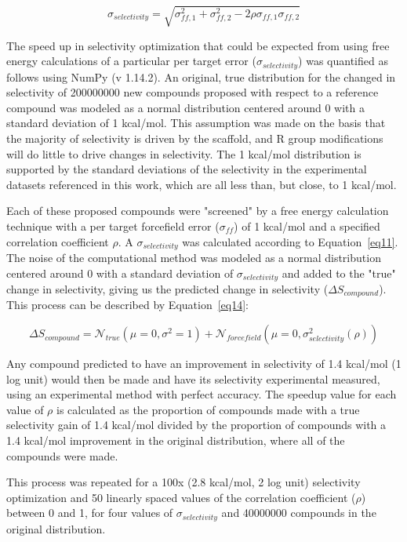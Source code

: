 \documentclass[9pt,lineno]{elife-modified} %
\begin{document}
\begin{equation}\label{eq11}
\sigma_{selectivity} = \sqrt{\sigma_{ff,1}^2 + \sigma_{ff,2}^2 - 2\rho\sigma_{ff,1}\sigma_{ff,2}}
\end{equation}

The speed up in selectivity optimization that could be expected from using free energy calculations of a particular per target error ($\sigma_{selectivity}$) was quantified as follows using NumPy (v 1.14.2). An original, true distribution for the changed in selectivity of 200000000 new compounds proposed with respect to a reference compound was modeled as a normal distribution centered around 0 with a standard deviation of 1 kcal/mol. This assumption was made on the basis that the majority of selectivity is driven by the scaffold, and R group modifications will do little to drive changes in selectivity. The 1 kcal/mol distribution is supported by the standard deviations of the selectivity in the experimental datasets referenced in this work, which are all less than, but close, to 1 kcal/mol. 

Each of these proposed compounds were "screened" by a free energy calculation technique with a per target forcefield error ($\sigma_{ff}$) of 1 kcal/mol and a specified correlation coefficient $\rho$. A $\sigma_{selectivity}$ was calculated according to Equation~\ref{eq11}. The noise of the computational method was modeled as a normal distribution centered around 0 with a standard deviation of $\sigma_{selectivity}$ and added to the "true" change in selectivity, giving us the predicted change in selectivity ($\Delta S_{compound}$). This process can be described by Equation~\ref{eq14}: 

\begin{equation}\label{eq14}
\Delta S_{compound} = \mathcal{N}_{true}(\mu =0, \sigma^2 = 1) + \mathcal{N}_{forcefield}(\mu =0, \sigma_{selectivity}^2(\rho))
\end{equation}

Any compound predicted to have an improvement in selectivity of 1.4 kcal/mol (1 log unit) would then be made and have its selectivity experimental measured, using an experimental method with perfect accuracy. The speedup value for each value of $\rho$ is calculated as the proportion of compounds made with a true selectivity gain of 1.4 kcal/mol divided by the proportion of compounds with a 1.4 kcal/mol improvement in the original distribution, where all of the compounds were made.

This process was repeated for a 100x (2.8 kcal/mol, 2 log unit) selectivity optimization and 50 linearly spaced values of the correlation coefficient ($\rho$) between 0 and 1, for four values of $\sigma_{selectivity}$ and 40000000 compounds in the original distribution. 
\end{document}

